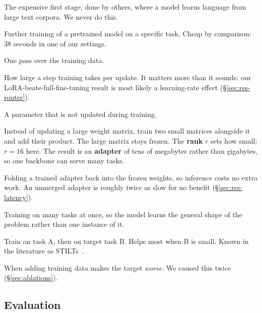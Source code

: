 \begin{description}[leftmargin=0em,style=nextline,itemsep=0.3em]

\item[Pretraining] The expensive first stage, done by others, where a
model learns language from large text corpora. We never do this.

\item[Fine-tuning] Further training of a pretrained model on a specific
task. Cheap by comparison: 38 seconds in one of our settings.

\item[Epoch] One pass over the training data.

\item[Learning rate] How large a step training takes per update. It
matters more than it sounds: our LoRA-beats-full-fine-tuning result is
most likely a learning-rate effect (\S\ref{sec:res-router}).

\item[Frozen] A parameter that is not updated during training.

\item[LoRA (Low-Rank Adaptation)] Instead of updating a large weight
matrix, train two small matrices alongside it and add their product. The
large matrix stays frozen. The \textbf{rank} $r$ sets how small; $r{=}16$
here. The result is an \textbf{adapter} of tens of megabytes rather than
gigabytes, so one backbone can serve many tasks.

\item[Merging] Folding a trained adapter back into the frozen weights, so
inference costs no extra work. An unmerged adapter is roughly twice as
slow for no benefit (\S\ref{sec:res-latency}).

\item[Multi-task mixture] Training on many tasks at once, so the model
learns the general shape of the problem rather than one instance of it.

\item[Intermediate-task transfer] Train on task A, then on target task B.
Helps most when B is small. Known in the literature as
STILTs~\cite{stilts}.

\item[Negative transfer] When adding training data makes the target
\emph{worse}. We caused this twice (\S\ref{sec:ablations}).

\end{description}

\subsection{Evaluation}

